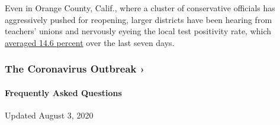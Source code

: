 Even in Orange County, Calif., where a cluster of conservative officials
has aggressively pushed for reopening, larger districts have been
hearing from teachers' unions and nervously eyeing the local test
positivity rate, which
\href{https://ochca.maps.arcgis.com/apps/opsdashboard/index.html\#/cc4859c8c522496b9f21c451de2fedae}{averaged
14.6 percent} over the last seven days.

\href{https://www.nytimes.com/news-event/coronavirus?action=click\&pgtype=Article\&state=default\&region=MAIN_CONTENT_3\&context=storylines_faq}{}

\hypertarget{the-coronavirus-outbreak-}{%
\subsubsection{The Coronavirus Outbreak
›}\label{the-coronavirus-outbreak-}}

\hypertarget{frequently-asked-questions}{%
\paragraph{Frequently Asked
Questions}\label{frequently-asked-questions}}

Updated August 3, 2020

